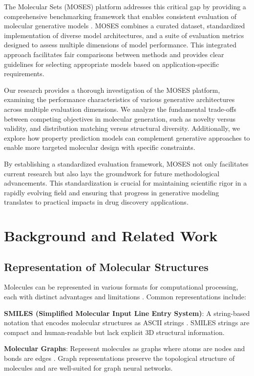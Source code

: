 \documentclass[conference]{IEEEtran}
\begin{document}
The Molecular Sets (MOSES) platform addresses this critical gap by providing a comprehensive benchmarking framework that enables consistent evaluation of molecular generative models \cite{Polykovskiy2020}. MOSES combines a curated dataset, standardized implementation of diverse model architectures, and a suite of evaluation metrics designed to assess multiple dimensions of model performance. This integrated approach facilitates fair comparisons between methods and provides clear guidelines for selecting appropriate models based on application-specific requirements.

Our research provides a thorough investigation of the MOSES platform, examining the performance characteristics of various generative architectures across multiple evaluation dimensions. We analyze the fundamental trade-offs between competing objectives in molecular generation, such as novelty versus validity, and distribution matching versus structural diversity. Additionally, we explore how property prediction models can complement generative approaches to enable more targeted molecular design with specific constraints.

By establishing a standardized evaluation framework, MOSES not only facilitates current research but also lays the groundwork for future methodological advancements. This standardization is crucial for maintaining scientific rigor in a rapidly evolving field and ensuring that progress in generative modeling translates to practical impacts in drug discovery applications.

\section{Background and Related Work}
\subsection{Representation of Molecular Structures}
Molecules can be represented in various formats for computational processing, each with distinct advantages and limitations \cite{Nantasenamat2010}. Common representations include:

\textbf{SMILES (Simplified Molecular Input Line Entry System)}: A string-based notation that encodes molecular structures as ASCII strings \cite{Weininger1988}. SMILES strings are compact and human-readable but lack explicit 3D structural information.

\textbf{Molecular Graphs}: Represent molecules as graphs where atoms are nodes and bonds are edges \cite{Duvenaud2015}. Graph representations preserve the topological structure of molecules and are well-suited for graph neural networks.
\end{document}

